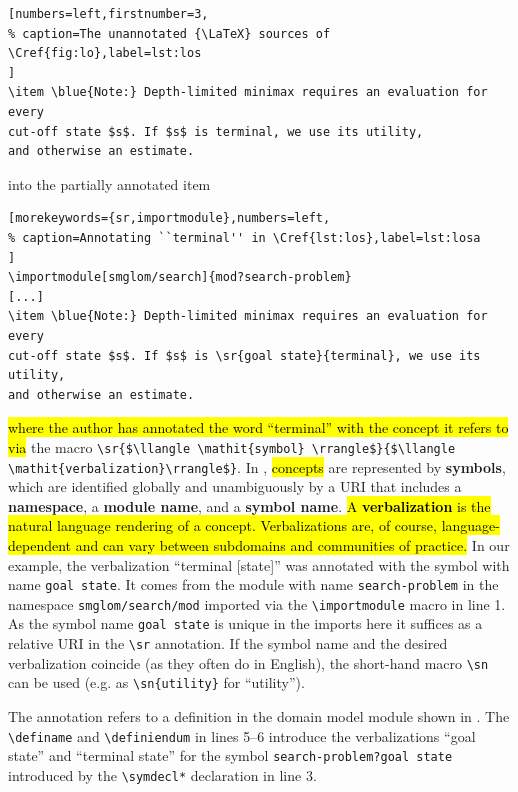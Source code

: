 \documentclass[runningheads]{llncs}
\def\edited#1{\hl{#1}}
\def\llangle{\langle\kern-.2em\langle}
\def\rrangle{\rangle\kern-.2em\rangle}
\begin{document}
\begin{lstlisting}[numbers=left,firstnumber=3,
% caption=The unannotated {\LaTeX} sources of \Cref{fig:lo},label=lst:los
]
\item \blue{Note:} Depth-limited minimax requires an evaluation for every
cut-off state $s$. If $s$ is terminal, we use its utility,
and otherwise an estimate.
\end{lstlisting}
into the partially annotated item
\begin{lstlisting}[morekeywords={sr,importmodule},numbers=left,
% caption=Annotating ``terminal'' in \Cref{lst:los},label=lst:losa
]
\importmodule[smglom/search]{mod?search-problem}
[...]
\item \blue{Note:} Depth-limited minimax requires an evaluation for every
cut-off state $s$. If $s$ is \sr{goal state}{terminal}, we use its utility,
and otherwise an estimate.
\end{lstlisting}
\edited{
where the author has annotated the word ``terminal'' with the concept it refers
to via} the \sTeX macro
\lstinline[mathescape]|\sr{$\llangle \mathit{symbol} \rrangle$}{$\llangle \mathit{verbalization}\rrangle$}|.
In \sTeX, \edited{concepts} are represented by \textbf{symbols}, which are identified
globally and unambiguously by a URI that includes a \textbf{namespace}, a \textbf{module name}, and a \textbf{symbol name}.
\edited{
A \textbf{verbalization} is the natural language rendering of a concept.
Verbalizations are, of course, language-dependent and can vary between subdomains and communities of
practice.
}
In our example, the verbalization ``terminal [state]'' was annotated with the symbol with
name \lstinline|goal state|. It comes from the module with name \lstinline|search-problem|
in the namespace \lstinline|smglom/search/mod| imported via the \lstinline|\importmodule|
macro in line 1. As the symbol name \lstinline|goal state| is unique in the imports here
it suffices as a relative URI in the \lstinline|\sr| annotation. If the symbol name and
the desired verbalization coincide (as they often do in English), the short-hand macro
\lstinline|\sn| can be used (e.g. as \lstinline|\sn{utility}| for ``utility'').


The annotation refers to a definition in the domain model module shown in
.  The \lstinline|\definame| and \lstinline|\definiendum| in lines
5--6 introduce the verbalizations ``goal state'' and ``terminal state'' for the symbol
\lstinline|search-problem?goal state| introduced by the \lstinline|\symdecl*| declaration in
line 3.
\end{document}

